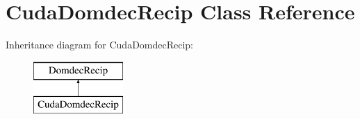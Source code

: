 \hypertarget{classCudaDomdecRecip}{}\section{Cuda\+Domdec\+Recip Class Reference}
\label{classCudaDomdecRecip}
Inheritance diagram for Cuda\+Domdec\+Recip\+:\begin{figure}[H]
\begin{center}
\leavevmode
\includegraphics[height=2.000000cm]{classCudaDomdecRecip}
\end{center}
\end{figure}

